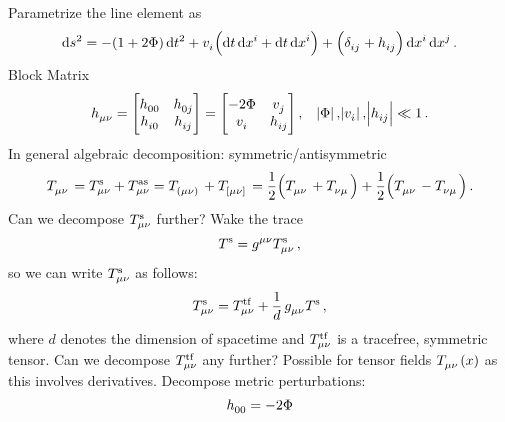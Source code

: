 Parametrize the line element as
\begin{equation}
	\dif s^2 = - \left(1+2\Phi\right)\dif t^2 + \tensor{v}{_i} \left(\dif t \dif \tensor{x}{^i} + \dif t \dif \tensor{x}{^i}\right) + \left(\tensor{\delta}{_{ij}} + \tensor{h}{_{ij}} \right)\dif \tensor{x}{^i}\dif \tensor{x}{^j}\,.
\end{equation}
Block Matrix
\begin{equation}
	\tensor{h}{_{\mu\nu}} =
	\begin{bmatrix}
		\tensor{h}{_{00}} & \tensor{h}{_{0j}} \\
		\tensor{h}{_{i0}} & \tensor{h}{_{ij}}
	\end{bmatrix}
	=
	\begin{bmatrix}
		-2\Phi & \tensor{v}{_{j}} \\
		\tensor{v}{_{i}} & \tensor{h}{_{ij}}
	\end{bmatrix}
	\, , \quad \abs{\Phi},\abs{\tensor{v}{_i}},\abs{\tensor{h}{_{ij}}} \ll 1\,.
\end{equation}
In general algebraic decomposition: symmetric/antisymmetric
\begin{equation}
	\tensor{T}{_{\mu\nu}} = \tensor*{T}{_{\mu\nu}^{\text{s}}} + \tensor*{T}{_{\mu\nu}^{\text{as}}} = \tensor{T}{_{(\mu\nu)}} + \tensor{T}{_{[\mu\nu]}} = \frac{1}{2}\left(\tensor{T}{_{\mu\nu}}+\tensor{T}{_{\nu\mu}}\right) + \frac{1}{2}\left(\tensor{T}{_{\mu\nu}}-\tensor{T}{_{\nu\mu}}\right)\,.
\end{equation}
Can we decompose $\tensor*{T}{_{\mu\nu}^{\text{s}}}$ further?\newline
Wake the trace
\begin{equation}
	\tensor{T}{^{\text{s}}} = \tensor{g}{^{\mu\nu}}\tensor*{T}{_{\mu\nu}^{\text{s}}}\, ,
\end{equation}
so we can write $\tensor*{T}{_{\mu\nu}^{\text{s}}}$ as follows:
\begin{equation}
	\tensor*{T}{_{\mu\nu}^{\text{s}}} = \tensor*{T}{_{\mu\nu}^{\text{tf}}} + \frac{1}{d}\,\tensor{g}{_{\mu\nu}}\tensor{T}{^{\text{s}}}\,,
\end{equation}
where $d$ denotes the dimension of spacetime and $\tensor*{T}{_{\mu\nu}^{\text{tf}}}$ is a tracefree, symmetric tensor.
Can we decompose $\tensor*{T}{_{\mu\nu}^{\text{tf}}}$ any further? Possible for tensor fields $\tensor{T}{_{\mu\nu}}(x)$ as this involves derivatives.
Decompose metric perturbations:
\begin{equation}
	\tensor{h}{_{00}} = -2\Phi
\end{equation}
